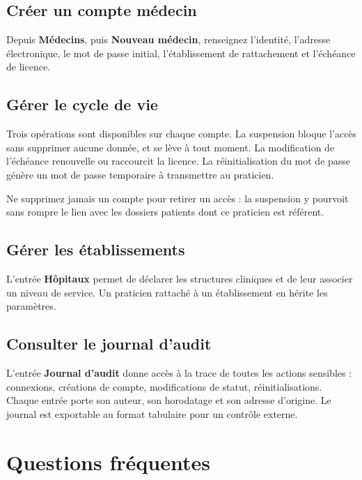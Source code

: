 \subsection*{Créer un compte médecin}

Depuis \textbf{Médecins}, puis \textbf{Nouveau médecin}, renseignez l'identité,
l'adresse électronique, le mot de passe initial, l'établissement de rattachement et
l'échéance de licence.

\subsection*{Gérer le cycle de vie}

Trois opérations sont disponibles sur chaque compte. La suspension bloque
l'accès sans supprimer aucune donnée, et se lève à tout moment. La modification
de l'échéance renouvelle ou raccourcit la licence. La réinitialisation du mot
de passe génère un mot de passe temporaire à transmettre au praticien.

\noindent
Ne supprimez jamais un compte pour retirer un accès : la suspension y pourvoit sans
rompre le lien avec les dossiers patients dont ce praticien est référent.

\subsection*{Gérer les établissements}

L'entrée \textbf{Hôpitaux} permet de déclarer les structures cliniques et de leur
associer un niveau de service. Un praticien rattaché à un établissement en hérite les
paramètres.

\subsection*{Consulter le journal d'audit}

L'entrée \textbf{Journal d'audit} donne accès à la trace de toutes les actions
sensibles : connexions, créations de compte, modifications de statut,
réinitialisations. Chaque entrée porte son auteur, son horodatage et son adresse
d'origine. Le journal est exportable au format tabulaire pour un contrôle externe.

\section{Questions fréquentes}

